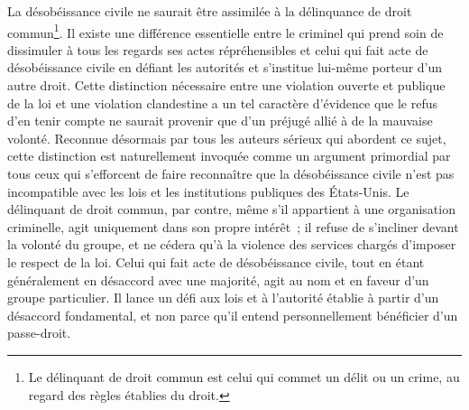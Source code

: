 
{La désobéissance civile ne saurait être assimilée à la délinquance de droit commun\footnote{Le délinquant de droit commun est celui qui commet un délit ou un crime, au regard des règles établies du droit.}. Il existe une différence essentielle entre le criminel qui prend soin de dissimuler à tous les regards ses actes répréhensibles et celui qui fait acte de désobéissance civile en défiant les autorités et s'institue lui-même porteur d'un autre droit. Cette distinction nécessaire entre une violation ouverte et publique de la loi et une violation clandestine a un tel caractère d'évidence que le refus d'en tenir compte ne saurait provenir que d'un préjugé allié à de la mauvaise volonté. Reconnue désormais par tous les auteurs sérieux qui abordent ce sujet, cette distinction est naturellement invoquée comme un argument primordial par tous ceux qui s'efforcent de faire reconnaître que la désobéissance civile n'est pas incompatible avec les lois et les institutions publiques des États-Unis. Le délinquant de droit commun, par contre, même s'il appartient à une organisation criminelle, agit uniquement dans son propre intérêt~; il refuse de s'incliner devant la volonté du groupe, et ne cédera qu'à la violence des services chargés d'imposer le respect de la loi. Celui qui fait acte de désobéissance civile, tout en étant généralement en désaccord avec une majorité, agit au nom et en faveur d'un groupe particulier. Il lance un défi aux lois et à l'autorité établie à partir d'un désaccord fondamental, et non parce qu'il entend personnellement bénéficier d'un passe-droit.
}



